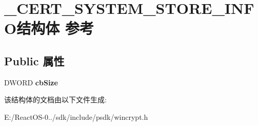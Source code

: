\hypertarget{struct___c_e_r_t___s_y_s_t_e_m___s_t_o_r_e___i_n_f_o}{}\section{\+\_\+\+C\+E\+R\+T\+\_\+\+S\+Y\+S\+T\+E\+M\+\_\+\+S\+T\+O\+R\+E\+\_\+\+I\+N\+F\+O结构体 参考}
\label{struct___c_e_r_t___s_y_s_t_e_m___s_t_o_r_e___i_n_f_o}
\subsection*{Public 属性}
\begin{DoxyCompactItemize}
\item 
\mbox{\label{struct___c_e_r_t___s_y_s_t_e_m___s_t_o_r_e___i_n_f_o_aff46b94ed3977682308a964ff18f2bf7}} 
D\+W\+O\+RD {\bfseries cb\+Size}
\end{DoxyCompactItemize}


该结构体的文档由以下文件生成\+:\begin{DoxyCompactItemize}
\item 
E\+:/\+React\+O\+S-\/0../sdk/include/psdk/wincrypt.\+h\end{DoxyCompactItemize}
